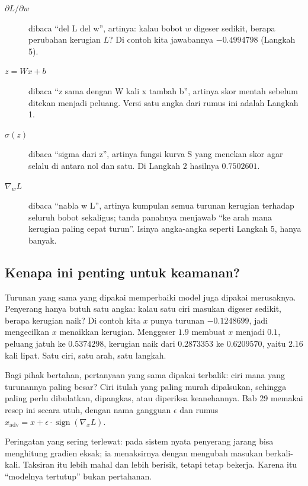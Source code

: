 \begin{description}
  \item[$\partial L/\partial w$] dibaca ``del L del w'', artinya: kalau bobot $w$ digeser
        sedikit, berapa perubahan kerugian $L$? Di contoh kita jawabannya $-0.4994798$
        (Langkah 5).
  \item[$z = Wx + b$] dibaca ``z sama dengan W kali x tambah b'', artinya skor mentah
        sebelum ditekan menjadi peluang. Versi satu angka dari rumus ini adalah Langkah 1.
  \item[$\sigma(z)$] dibaca ``sigma dari z'', artinya fungsi kurva S yang menekan skor agar
        selalu di antara nol dan satu. Di Langkah 2 hasilnya $0.7502601$.
  \item[$\nabla_w L$] dibaca ``nabla w L'', artinya kumpulan semua turunan kerugian
        terhadap seluruh bobot sekaligus; tanda panahnya menjawab ``ke arah mana kerugian
        paling cepat turun''. Isinya angka-angka seperti Langkah 5, hanya banyak.
\end{description}

\subsection{Kenapa ini penting untuk keamanan?}

Turunan yang sama yang dipakai memperbaiki model juga dipakai merusaknya. Penyerang hanya
butuh satu angka: kalau satu ciri masukan digeser sedikit, berapa kerugian naik? Di contoh
kita $x$ punya turunan $-0.1248699$, jadi mengecilkan $x$ menaikkan kerugian. Menggeser
$1.9$ membuat $x$ menjadi $0.1$, peluang jatuh ke $0.5374298$, kerugian naik dari $0.2873353$ ke
$0.6209570$, yaitu $2.16$ kali lipat. Satu ciri, satu arah, satu langkah.

Bagi pihak bertahan, pertanyaan yang sama dipakai terbalik: ciri mana yang turunannya
paling besar? Ciri itulah yang paling murah dipalsukan, sehingga paling perlu dibulatkan,
dipangkas, atau diperiksa keanehannya. Bab 29 memakai resep ini secara utuh, dengan nama
gangguan $\epsilon$ dan rumus
$x_{\mathrm{adv}} = x + \epsilon \cdot \operatorname{sign}(\nabla_x L)$.

\begin{catatan}
Peringatan yang sering terlewat: pada sistem nyata penyerang jarang bisa menghitung gradien
eksak; ia menaksirnya dengan mengubah masukan berkali-kali. Taksiran itu lebih mahal dan
lebih berisik, tetapi tetap bekerja. Karena itu ``modelnya tertutup'' bukan pertahanan.
\end{catatan}

